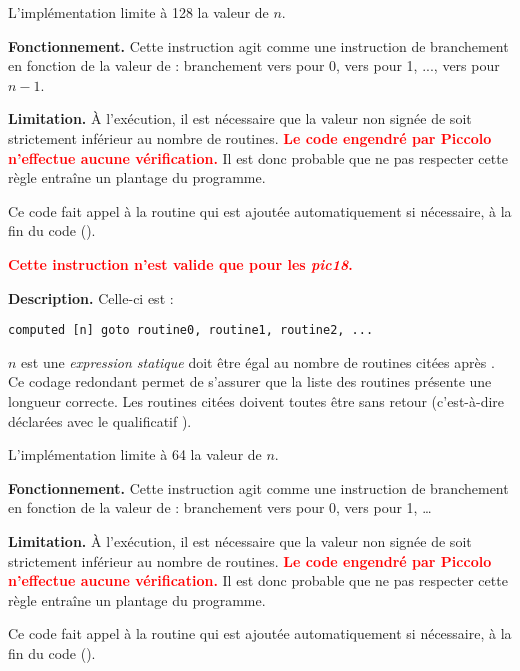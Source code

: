 L'implémentation limite à 128 la valeur de $n$.

\textbf{Fonctionnement.} Cette instruction agit comme une instruction de branchement en fonction de la valeur de  : branchement vers  pour 0, vers  pour 1, ..., vers  pour $n-1$. 

\textbf{Limitation.} À l'exécution, il est nécessaire que la valeur non signée de  soit strictement inférieur au nombre de routines. \textcolor{red}{\bf Le code engendré par Piccolo n'effectue aucune vérification.} Il est donc probable que ne pas respecter cette règle entraîne un plantage du programme.

Ce code fait appel à la routine  qui est ajoutée automatiquement si nécessaire, à la fin du code (). 




\textcolor{red}{\bf Cette instruction n'est valide que pour les \emph{pic18}.}

\textbf{Description.} Celle-ci est :
\begin{lstlisting}[language=piccolo]
computed [n] goto routine0, routine1, routine2, ...
\end{lstlisting}

$n$ est une \emph{expression statique} doit être égal au nombre de routines citées après . Ce codage redondant permet de s'assurer que la liste des routines présente une longueur correcte. Les routines citées doivent toutes être sans retour (c'est-à-dire déclarées avec le qualificatif ).

L'implémentation limite à 64 la valeur de $n$.

\textbf{Fonctionnement.} Cette instruction agit comme une instruction de branchement en fonction de la valeur de  : branchement vers  pour 0, vers  pour 1, \dots 

\textbf{Limitation.} À l'exécution, il est nécessaire que la valeur non signée de  soit strictement inférieur au nombre de routines. \textcolor{red}{\bf Le code engendré par Piccolo n'effectue aucune vérification.} Il est donc probable que ne pas respecter cette règle entraîne un plantage du programme.


Ce code fait appel à la routine  qui est ajoutée automatiquement si nécessaire, à la fin du code (). 




